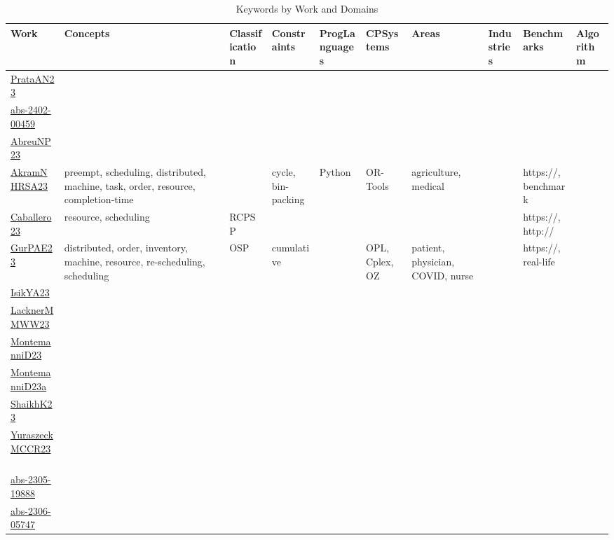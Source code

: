 {\scriptsize
\begin{longtable}{p{3cm}p{4cm}p{2cm}p{2cm}p{2cm}p{2cm}p{2cm}p{2cm}p{2cm}p{2cm}}
\caption{Keywords by Work and Domains}\\ \toprule
Work & Concepts & Classification & Constraints & ProgLanguages & CPSystems & Areas & Industries & Benchmarks & Algorithm\\ \midrule\endhead
\bottomrule
\endfoot
\href{articles/PrataAN23.pdf}{PrataAN23}~\cite{PrataAN23} &  &  &  &  &  &  &  &  & \\
\href{articles/abs-2402-00459.pdf}{abs-2402-00459}~\cite{abs-2402-00459} &  &  &  &  &  &  &  &  & \\
\href{}{AbreuNP23}~\cite{AbreuNP23} &  &  &  &  &  &  &  &  & \\
\href{articles/AkramNHRSA23.pdf}{AkramNHRSA23}~\cite{AkramNHRSA23} & preempt, scheduling, distributed, machine, task, order, resource, completion-time &  & cycle, bin-packing & Python & OR-Tools & agriculture, medical &  & https://, benchmark & \\
\href{articles/Caballero23.pdf}{Caballero23}~\cite{Caballero23} & resource, scheduling & RCPSP &  &  &  &  &  & https://, http:// & \\
\href{articles/GurPAE23.pdf}{GurPAE23}~\cite{GurPAE23} & distributed, order, inventory, machine, resource, re-scheduling, scheduling & OSP & cumulative &  & OPL, Cplex, OZ & patient, physician, COVID, nurse &  & https://, real-life & \\
\href{articles/IsikYA23.pdf}{IsikYA23}~\cite{IsikYA23} &  &  &  &  &  &  &  &  & \\
\href{articles/LacknerMMWW23.pdf}{LacknerMMWW23}~\cite{LacknerMMWW23} &  &  &  &  &  &  &  &  & \\
\href{articles/MontemanniD23.pdf}{MontemanniD23}~\cite{MontemanniD23} &  &  &  &  &  &  &  &  & \\
\href{articles/MontemanniD23a.pdf}{MontemanniD23a}~\cite{MontemanniD23a} &  &  &  &  &  &  &  &  & \\
\href{}{ShaikhK23}~\cite{ShaikhK23} &  &  &  &  &  &  &  &  & \\
\href{articles/YuraszeckMCCR23.pdf}{YuraszeckMCCR23}~\cite{YuraszeckMCCR23} &  &  &  &  &  &  &  &  & \\
\href{articles/abs-2305-19888.pdf}{abs-2305-19888}~\cite{abs-2305-19888} &  &  &  &  &  &  &  &  & \\
\href{articles/abs-2306-05747.pdf}{abs-2306-05747}~\cite{abs-2306-05747} &  &  &  &  &  &  &  &  & \\

\end{longtable}}
